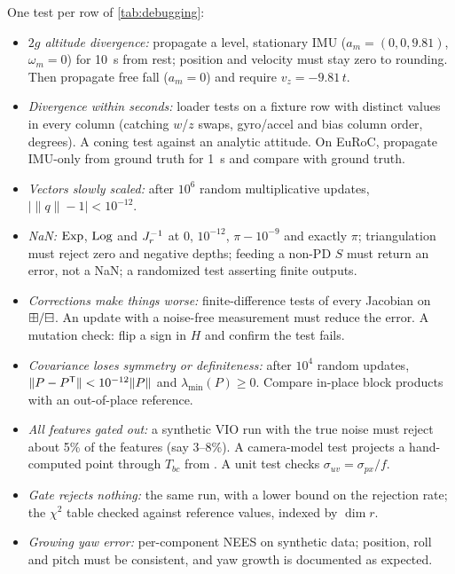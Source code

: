 \begin{solutions}
  \item One test per row of \cref{tab:debugging}:
        \begin{itemize}
          \item \emph{$2g$ altitude divergence:} propagate a level, stationary IMU ($a_m = (0, 0, 9.81)$, $\omega_m = 0$) for 10~s from rest; position and velocity must stay
                zero to rounding. Then propagate free fall ($a_m = 0$) and require $v_z = -9.81\,t$.
          \item \emph{Divergence within seconds:} loader tests on a fixture row with distinct values in every column (catching $w$/$z$ swaps, gyro/accel and bias column
                order, degrees). A coning test against an analytic attitude. On EuRoC, propagate IMU-only from ground truth for 1~s and compare with ground truth.
          \item \emph{Vectors slowly scaled:} after $10^6$ random multiplicative updates, $\big|\|q\| - 1\big| < 10^{-12}$.
          \item \emph{NaN:} $\operatorname{Exp}$, $\operatorname{Log}$ and $J_r^{-1}$ at $0$, $10^{-12}$, $\pi - 10^{-9}$ and exactly $\pi$; triangulation must reject zero and negative depths; feeding a non-PD $S$ must return an
                error, not a NaN; a randomized test asserting finite outputs.
          \item \emph{Corrections make things worse:} finite-difference tests of every Jacobian on $\boxplus/\boxminus$. An update with a noise-free measurement must reduce the
                error. A mutation check: flip a sign in $H$ and confirm the test fails.
          \item \emph{Covariance loses symmetry or definiteness:} after $10^4$ random updates, $\|P - P^{\mathsf{T}}\| < 10^{-12}\|P\|$ and $\lambda_{\min}(P) \ge 0$. Compare in-place block products with an
                out-of-place reference.
          \item \emph{All features gated out:} a synthetic VIO run with the true noise must reject about 5\% of the features (say 3--8\%). A camera-model test projects a hand-computed
                point through $T_{bc}$ from . A unit test checks $\sigma_{uv} = \sigma_{px}/f$.
          \item \emph{Gate rejects nothing:} the same run, with a lower bound on the rejection rate; the $\chi^2$ table checked against reference values, indexed by
                $\dim r$.
          \item \emph{Growing yaw error:} per-component NEES on synthetic data; position, roll and pitch must be consistent, and yaw growth is documented as expected.

\end{itemize}
\end{solutions}
